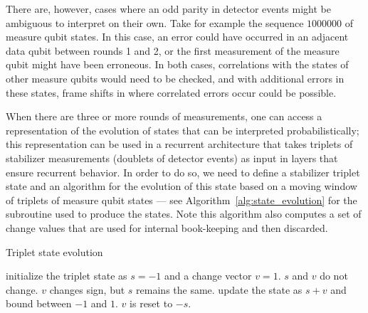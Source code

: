There are, however, cases where an odd parity in detector events might be ambiguous to interpret on their own. Take for example the sequence $1000000$ of measure qubit states. In this case, an error could have occurred in an adjacent data qubit between rounds 1 and 2, or the first measurement of the measure qubit might have been erroneous. In both cases, correlations with the states of other measure qubits would need to be checked, and with additional errors in these states, frame shifts in where correlated errors occur could be possible.

When there are three or more rounds of measurements, one can access a representation of the evolution of states that can be interpreted probabilistically; this representation can be used in a recurrent architecture that takes triplets of stabilizer measurements (doublets of detector events) as input in layers that ensure recurrent behavior. 
In order to do so, we need to define a stabilizer triplet state and an algorithm for the evolution of this state based on a moving window of triplets of measure qubit states --- see Algorithm~\ref{alg:state_evolution} for the subroutine used to produce the states. Note this algorithm also computes a set of change values that are used for internal book-keeping and then discarded.

\begin{algorithm}
\caption{Triplet state evolution}
\begin{algorithmic}[1]
      \State initialize the triplet state as $s=-1$ and a change vector $v=1$.
    \EndIf
      \State $s$ and $v$ do not change.
    \Else
        \State $v$ changes sign, but $s$ remains the same.
      \Else
        \State update the state as $s+v$ and bound between $-1$ and $1$.
      \EndIf
    \EndIf
      \State $v$ is reset to $-s$.
    \EndIf
  \EndFor
\EndFor
\end{algorithmic}
\label{alg:state_evolution}
\end{algorithm}

